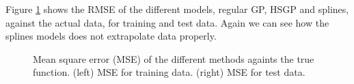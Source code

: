 \documentclass[]{interact}
\theoremstyle{plain}%
\theoremstyle{definition}
\theoremstyle{remark}
\begin{document}
Figure \ref{fig14_MSE_train_gaydata} shows the RMSE of the different models, regular GP, HSGP and splines, against the actual data, for training and test data. Again we can see how the splines models does not extrapolate data properly.

\begin{figure}[H]
\centering
{}
\caption{Mean square error (MSE) of the different methods againts the true function. (left) MSE for training data. (right) MSE for test data.}
  \label{fig14_MSE_train_gaydata}
\end{figure}
\end{document}
